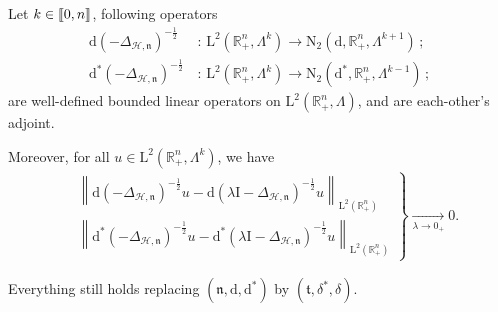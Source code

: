 \documentclass[AHL,Unicode,longabstracts,published]{cedram}
\newcommand{\bbR}{\mathbb{R}}
\newcommand{\rmd}{\mathrm{d}}
\newcommand{\rmL}{\mathrm{L}}
\newcommand{\rmN}{\mathrm{N}}
\newcommand{\rmI}{\mathrm{I}}
\newcommand{\clH}{\mathcal{H}}
\newcommand{\fkn}{\mathfrak{n}}
\newcommand{\fkt}{\mathfrak{t}}
\newcommand{\llbracket}{\mathopen{[\mkern -2.7mu[}}
\newcommand{\rrbracket}{\mathclose{]\mkern -2.7mu]}}
\newcommand{\llb}{\llbracket}
\newcommand{\rrb}{\rrbracket}
\begin{document}
\begin{lemm}\label{lem:RiesztransfHodgeL2Rn+}
Let $k\in\llb 0,n\rrb$, following operators
\begin{align*}
\rmd(-\Delta_{\clH,\fkn})^{-\frac{1}{2}}\,&:\,\rmL^2\left(\bbR^{n}_+,\Lambda^k\right)\longrightarrow \rmN _2\left(\rmd,\bbR^{n}_+,\Lambda^{k+1}\right)\, ;\\
\rmd^\ast(-\Delta_{\clH,\fkn})^{-\frac{1}{2}}\,&:\,\rmL^2\left(\bbR^{n}_+,\Lambda^k\right)\longrightarrow \rmN_2\left(\rmd^\ast,\bbR^{n}_+,\Lambda^{k-1}\right)\, ;
\end{align*}
are well-defined bounded linear operators on
$\rmL^2(\bbR^{n}_+,\Lambda)$, and are each-other's adjoint.

Moreover, for all $u\in\rmL^2(\bbR^{n}_+,\Lambda^k)$, we have
\begin{align*}
\left.
\begin{array}{ll}
&\left\| \rmd(-\Delta_{\clH,\fkn})^{-\frac{1}{2}} u - \rmd(\lambda\rmI -\Delta_{\clH,\fkn})^{-\frac{1}{2}} u\right\|_{\rmL^2\left(\bbR^n_+\right)} \\
& \left\| \rmd^\ast\left(-\Delta_{\clH,\fkn}\right)^{-\frac{1}{2}} u - \rmd^\ast(\lambda\rmI -\Delta_{\clH,\fkn})^{-\frac{1}{2}} u\right\|_{\rmL^2\left(\bbR^n_+\right)}
\end{array}\right\}\xrightarrow[\lambda \rightarrow 0_+]{}0.
\end{align*}

Everything still holds replacing $(\fkn,\rmd,\rmd^\ast)$ by $(\fkt,\delta^\ast,\delta)$.
\end{lemm}
\end{document}
